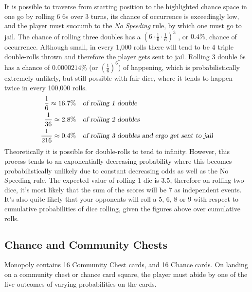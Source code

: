 \documentclass[12pt]{article}
\begin{document}
It is possible to traverse from starting position to the highlighted chance space in one go by rolling 6 6s over 3 turns, its chance of occurrence is exceedingly low, and the player must succumb to the \emph{No Speeding} rule, by which one must go to jail. The chance of rolling three doubles has a $\left(6 \cdot \frac{1}{6} \cdot \frac{1}{6}\right)^3$ , or $0.4\%$, chance of occurrence. Although small, in every 1,000 rolls there will tend to be 4 triple double-rolls thrown and therefore the player gets sent to jail. Rolling 3 double 6s has a chance of $0.0000214\%$ (or $\left(\frac{1}{6}\right)^{6}$) of happening, which is probabilistically extremely unlikely, but still possible with fair dice, where it tends to happen twice in every 100,000 rolls.\\
\begin{align*}
\frac{1}{6}\approx16.7\% \quad &\textsl{of rolling 1 double}\\
\frac{1}{36}\approx2.8\% \quad &\textsl{of rolling 2 doubles}\\
\frac{1}{216}\approx0.4\% \quad &\textsl{of rolling 3 doubles and ergo get sent to jail} 
\end{align*}
Theoretically it is possible for double-rolls to tend to infinity. However, this process tends to an exponentially decreasing probability where this becomes probabilistically unlikely due to constant decreasing odds as well as the No Speeding rule.
The expected value of rolling 1 die is 3.5, therefore on rolling two dice, it's most likely that the sum of the scores will be 7 as independent events.\cite{bewersdorffj} It's also quite likely that your opponents will roll a 5, 6, 8 or 9 with respect to cumulative probabilities of dice rolling, given the figures above over cumulative rolls.\cite{bewersdorffj}
\subsection{Chance and Community Chests}
Monopoly contains 16 Community Chest cards, and 16 Chance cards. On landing on a community chest or chance card square, the player must abide by one of the five outcomes of varying probabilities on the cards.
\end{document}
